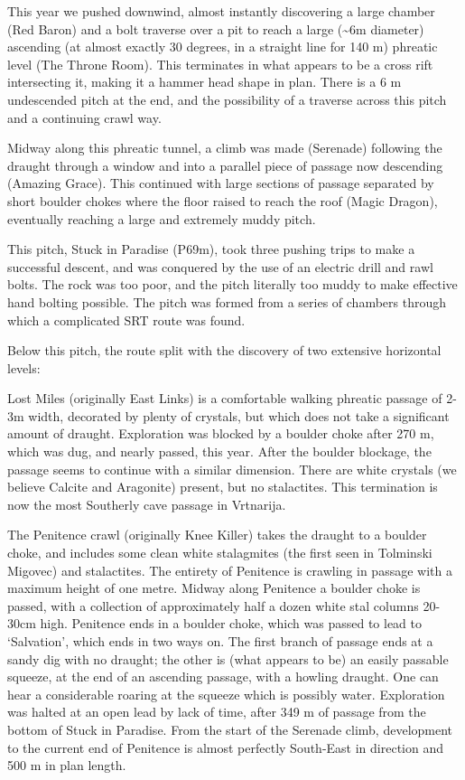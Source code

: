 This year we pushed downwind, almost instantly discovering a large
chamber (Red Baron) and a bolt traverse over a pit to reach a large
(\textasciitilde{}6m diameter) ascending (at almost exactly 30 degrees,
in a straight line for 140 m) phreatic level (The Throne Room). This
terminates in what appears to be a cross rift intersecting it, making it
a hammer head shape in plan. There is a 6 m undescended pitch at the
end, and the possibility of a traverse across this pitch and a
continuing crawl way.

Midway along this phreatic tunnel, a climb was made (Serenade) following
the draught through a window and into a parallel piece of passage now
descending (Amazing Grace). This continued with large sections of
passage separated by short boulder chokes where the floor raised to
reach the roof (Magic Dragon), eventually reaching a large and extremely
muddy pitch.

This pitch, Stuck in Paradise (P69m), took three pushing trips to make a
successful descent, and was conquered by the use of an electric drill
and rawl bolts. The rock was too poor, and the pitch literally too muddy
to make effective hand bolting possible. The pitch was formed from a
series of chambers through which a complicated SRT route was found.

Below this pitch, the route split with the discovery of two extensive
horizontal levels:

Lost Miles (originally East Links) is a comfortable walking phreatic
passage of 2-3m width, decorated by plenty of crystals, but which does
not take a significant amount of draught. Exploration was blocked by a
boulder choke after 270 m, which was dug, and nearly passed, this year.
After the boulder blockage, the passage seems to continue with a similar
dimension. There are white crystals (we believe Calcite and Aragonite)
present, but no stalactites. This termination is now the most Southerly
cave passage in Vrtnarija.

The Penitence crawl (originally Knee Killer) takes the draught to a
boulder choke, and includes some clean white stalagmites (the first seen
in Tolminski Migovec) and stalactites. The entirety of Penitence is
crawling in passage with a maximum height of one metre. Midway along
Penitence a boulder choke is passed, with a collection of approximately
half a dozen white stal columns 20-30cm high. Penitence ends in a
boulder choke, which was passed to lead to `Salvation', which ends in
two ways on. The first branch of passage ends at a sandy dig with no
draught; the other is (what appears to be) an easily passable squeeze,
at the end of an ascending passage, with a howling draught. One can hear
a considerable roaring at the squeeze which is possibly water.
Exploration was halted at an open lead by lack of time, after 349 m of
passage from the bottom of Stuck in Paradise. From the start of the
Serenade climb, development to the current end of Penitence is almost
perfectly South-East in direction and 500 m in plan length.

